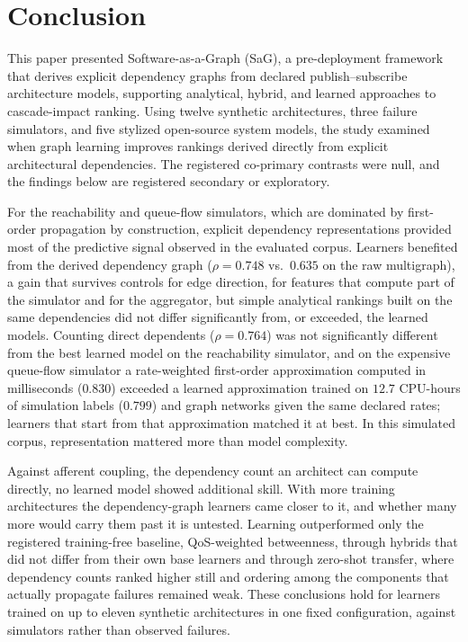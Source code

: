 \documentclass[preprint,3p]{elsarticle}
\begin{document}
\section{Conclusion}
\label{sec:9}

This paper presented Software-as-a-Graph (SaG), a pre-deployment framework that derives explicit dependency graphs from declared publish--subscribe architecture models, supporting analytical, hybrid, and learned approaches to cascade-impact ranking. Using twelve synthetic architectures, three failure simulators, and five stylized open-source system models, the study examined when graph learning improves rankings derived directly from explicit architectural dependencies. The registered co-primary contrasts were null, and the findings below are registered secondary or exploratory.

For the reachability and queue-flow simulators, which are dominated by first-order propagation by construction, explicit dependency representations provided most of the predictive signal observed in the evaluated corpus. Learners benefited from the derived dependency graph ($\rho = 0.748$ vs.\ $0.635$ on the raw multigraph), a gain that survives controls for edge direction, for features that compute part of the simulator and for the aggregator, but simple analytical rankings built on the same dependencies did not differ significantly from, or exceeded, the learned models. Counting direct dependents ($\rho = 0.764$) was not significantly different from the best learned model on the reachability simulator, and on the expensive queue-flow simulator a rate-weighted first-order approximation computed in milliseconds ($0.830$) exceeded a learned approximation trained on $12.7$ CPU-hours of simulation labels ($0.799$) and graph networks given the same declared rates; learners that start from that approximation matched it at best. In this simulated corpus, representation mattered more than model complexity.

Against afferent coupling, the dependency count an architect can compute directly, no learned model showed additional skill. With more training architectures the dependency-graph learners came closer to it, and whether many more would carry them past it is untested. Learning outperformed only the registered training-free baseline, QoS-weighted betweenness, through hybrids that did not differ from their own base learners and through zero-shot transfer, where dependency counts ranked higher still and ordering among the components that actually propagate failures remained weak. These conclusions hold for learners trained on up to eleven synthetic architectures in one fixed configuration, against simulators rather than observed failures.
\end{document}

